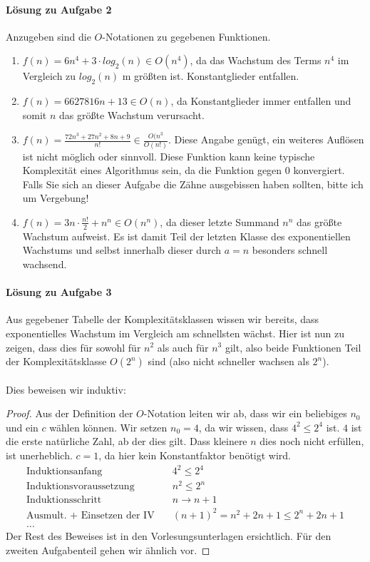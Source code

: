 \documentclass[11pt,a4paper]{scrartcl}
\begin{document}
\paragraph{Lösung zu Aufgabe 2} \label{a2:lsg}
Anzugeben sind die $O$-Notationen zu gegebenen Funktionen.
\begin{enumerate}
\item $f(n) = 6n^4 + 3 \cdot log_2(n) \in O(n^4)$, da das Wachstum des Terms $n^4$ im Vergleich zu $log_2(n)$ m größten ist. Konstantglieder entfallen.
\item $f(n) = 6627816n + 13 \in O(n)$, da Konstantglieder immer entfallen und somit $n$ das größte Wachstum verursacht.
\item $f(n) = \frac{72n^{3} + 27n^{2} + 8n + 9}{n!} \in \frac{O(n^3}{O(n!)}$. Diese Angabe genügt, ein weiteres Auflösen ist nicht möglich oder sinnvoll. Diese Funktion kann keine typische Komplexität eines Algorithmus sein, da die Funktion gegen 0 konvergiert. Falls Sie sich an dieser Aufgabe die Zähne ausgebissen haben sollten, bitte ich um Vergebung!
\item $f(n) = 3n \cdot \frac{n!}{2} + n^n \in O(n^n)$, da dieser letzte Summand $n^n$ das größte Wachstum aufweist. Es ist damit Teil der letzten Klasse des exponentiellen Wachstums und selbst innerhalb dieser durch $a=n$ besonders schnell wachsend. 
\end{enumerate}
\paragraph{Lösung zu Aufgabe 3} \label{a3:lsg}
Aus gegebener Tabelle der Komplexitätsklassen wissen wir bereits, dass exponentielles Wachstum im Vergleich am schnellsten wächst. Hier ist nun zu zeigen, dass dies für sowohl für $n^2$ als auch für $n^3$ gilt, also beide Funktionen Teil der Komplexitätsklasse $O(2^n)$ sind (also nicht schneller wachsen als $2^n$). \\\\
Dies beweisen wir induktiv:
\begin{proof}
Aus der Definition der $O$-Notation leiten wir ab, dass wir ein beliebiges $n_0$ und ein $c$ wählen können. Wir setzen $n_0 = 4$, da wir wissen, dass $4^2 \leq 2^4$ ist. $4$ ist die erste natürliche Zahl, ab der dies gilt. Dass kleinere $n$ dies noch nicht erfüllen, ist unerheblich. $c = 1$, da hier kein Konstantfaktor benötigt wird.
\begin{align*}
\text{Induktionsanfang} \quad & 4^2 \leq 2^4 \\
\text{Induktionsvoraussetzung} \quad & n^2 \leq 2^n \\
\text{Induktionsschritt} \quad & n \to n + 1 \\
\text{Ausmult. + Einsetzen der IV} \quad & (n+1)^2 = n^2 + 2n + 1 \leq 2^n + 2n + 1 \\
...
\end{align*}
Der Rest des Beweises ist in den Vorlesungsunterlagen ersichtlich. Für den zweiten Aufgabenteil gehen wir ähnlich vor.
\end{proof}
\end{document}
